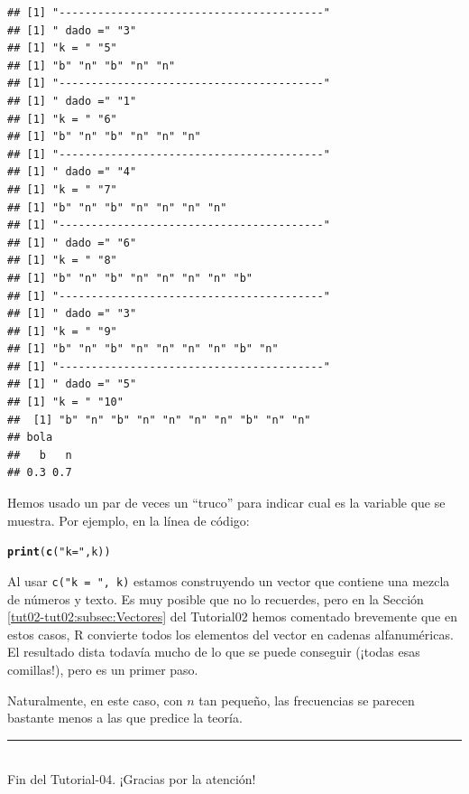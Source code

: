 \documentclass[10pt,a4paper]{article}\usepackage[]{graphicx}\usepackage[]{color}
\makeatletter
\newcommand{\hlstr}[1]{\textcolor[rgb]{0.192,0.494,0.8}{#1}}%
\newcommand{\hlstd}[1]{\textcolor[rgb]{0.345,0.345,0.345}{#1}}%
\newcommand{\hlkwd}[1]{\textcolor[rgb]{0.737,0.353,0.396}{\textbf{#1}}}%
\newenvironment{kframe}{%
 \def\at@end@of@kframe{}%
 \ifinner\ifhmode%
  \def\at@end@of@kframe{\end{minipage}}%
  \begin{minipage}{\columnwidth}%
 \fi\fi%
 \def\FrameCommand##1{\hskip\@totalleftmargin \hskip-\fboxsep
 \colorbox{shadecolor}{##1}\hskip-\fboxsep
     \hskip-\linewidth \hskip-\@totalleftmargin \hskip\columnwidth}%
 \MakeFramed {\advance\hsize-\width
   \@totalleftmargin\z@ \linewidth\hsize
   \@setminipage}}%
 {\par\unskip\endMakeFramed%
 \at@end@of@kframe}
\newenvironment{knitrout}{}{} %
\newcounter {cont01}
\makeatother
\begin{document}
\begin{enumerate}
\begin{knitrout}
\begin{kframe}
\begin{verbatim}
## [1] "-----------------------------------------"
## [1] " dado =" "3"      
## [1] "k = " "5"   
## [1] "b" "n" "b" "n" "n"
## [1] "-----------------------------------------"
## [1] " dado =" "1"      
## [1] "k = " "6"   
## [1] "b" "n" "b" "n" "n" "n"
## [1] "-----------------------------------------"
## [1] " dado =" "4"      
## [1] "k = " "7"   
## [1] "b" "n" "b" "n" "n" "n" "n"
## [1] "-----------------------------------------"
## [1] " dado =" "6"      
## [1] "k = " "8"   
## [1] "b" "n" "b" "n" "n" "n" "n" "b"
## [1] "-----------------------------------------"
## [1] " dado =" "3"      
## [1] "k = " "9"   
## [1] "b" "n" "b" "n" "n" "n" "n" "b" "n"
## [1] "-----------------------------------------"
## [1] " dado =" "5"      
## [1] "k = " "10"  
##  [1] "b" "n" "b" "n" "n" "n" "n" "b" "n" "n"
## bola
##   b   n 
## 0.3 0.7
\end{verbatim}
\end{kframe}
\end{knitrout}
    Hemos usado un par de veces un ``truco'' para indicar cual es la variable que se muestra. Por ejemplo, en la línea de código:
\begin{knitrout}
\color{fgcolor}\begin{kframe}
\begin{alltt}
\hlkwd{print}\hlstd{(}\hlkwd{c}\hlstd{(}\hlstr{"k = "}\hlstd{, k))}
\end{alltt}
\end{kframe}
\end{knitrout}
    Al usar {\tt c("k = ", k)} estamos construyendo un vector que contiene una mezcla de números y texto. Es muy posible que no lo recuerdes, pero en la Sección \ref{tut02-tut02:subsec:Vectores} del Tutorial02 hemos comentado brevemente que en estos casos, R convierte todos los elementos del vector en cadenas alfanuméricas. El resultado dista todavía mucho de lo que se puede conseguir (¡todas esas comillas!), pero es un primer paso.

    Naturalmente, en este caso, con $n$ tan pequeño, las frecuencias se parecen bastante menos a las que predice la teoría.

\end{enumerate}






\vspace{2cm} \hrule
\quad\\
Fin del Tutorial-04. ¡Gracias por la atención!

%
\end{document}
